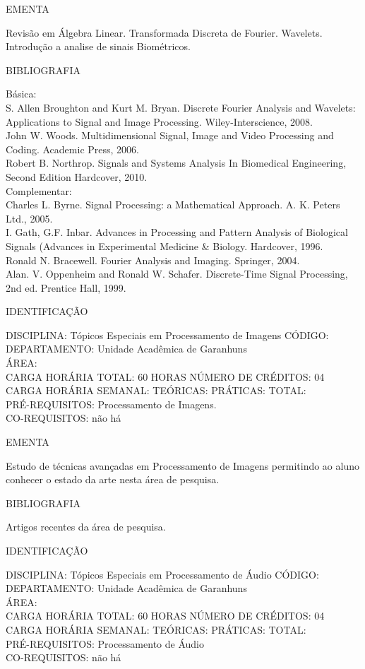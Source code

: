 \documentclass[
	12pt,				%
	openright,			%
  oneside,     %
	a4paper,			%
	english,			%
	french,				%
	spanish,			%
	brazil				%
	]{abntex2}
\begin{document}
\begin{apendicesenv}
EMENTA 

Revisão em Álgebra Linear. Transformada Discreta de Fourier. Wavelets.
Introdução a analise de sinais Biométricos. 

BIBLIOGRAFIA 

Básica:\\
S. Allen Broughton and Kurt M. Bryan. Discrete Fourier Analysis and
Wavelets: Applications to Signal and Image Processing.
Wiley-Interscience, 2008.\\
John W. Woods. Multidimensional Signal, Image and Video Processing and
Coding. Academic Press, 2006.\\
Robert B. Northrop. Signals and Systems Analysis In Biomedical
Engineering, Second Edition  Hardcover, 2010.\\
Complementar:\\
Charles L. Byrne. Signal Processing: a Mathematical Approach. A. K.
Peters Ltd., 2005.\\
I. Gath, G.F. Inbar. Advances in Processing and Pattern Analysis of
Biological Signals (Advances in Experimental Medicine \& Biology.
Hardcover, 1996.\\
Ronald N. Bracewell. Fourier Analysis and Imaging. Springer, 2004.\\
Alan. V. Oppenheim and Ronald W. Schafer. Discrete-Time Signal
Processing, 2nd ed. Prentice Hall, 1999.

\newpage IDENTIFICAÇÃO

DISCIPLINA: Tópicos Especiais em Processamento de Imagens CÓDIGO:\\ 
DEPARTAMENTO: Unidade Acadêmica de Garanhuns\\ 
ÁREA: \\
CARGA HORÁRIA TOTAL: 60 HORAS NÚMERO DE CRÉDITOS: 04\\
CARGA HORÁRIA SEMANAL: TEÓRICAS: PRÁTICAS: TOTAL: \\
PRÉ-REQUISITOS: Processamento de Imagens.\\
CO-REQUISITOS: não há

EMENTA 

Estudo de técnicas avançadas em Processamento de Imagens permitindo ao
aluno conhecer o estado da arte nesta área de pesquisa.

BIBLIOGRAFIA 

Artigos recentes da área de pesquisa.

\newpage IDENTIFICAÇÃO

DISCIPLINA: Tópicos Especiais em Processamento de Áudio CÓDIGO:\\ 
DEPARTAMENTO: Unidade Acadêmica de Garanhuns\\ 
ÁREA: \\
CARGA HORÁRIA TOTAL: 60 HORAS NÚMERO DE CRÉDITOS: 04\\
CARGA HORÁRIA SEMANAL: TEÓRICAS: PRÁTICAS: TOTAL: \\
PRÉ-REQUISITOS: Processamento de Áudio\\
CO-REQUISITOS: não há


\end{apendicesenv}
\end{document}
